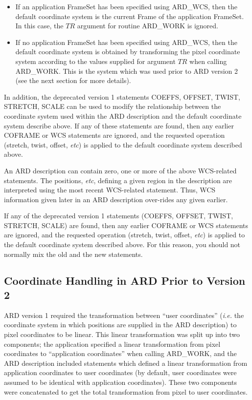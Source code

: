 \documentclass[11pt,nolof]{starlink}
\begin{document}
\begin{enumerate}
\begin{itemize}
\item If an application FrameSet has been specified using ARD\_WCS, then
the default coordinate system is the current Frame of the application
FrameSet. In this case, the $TR$ argument for routine ARD\_WORK is ignored.

\item If no application FrameSet has been specified using ARD\_WCS, then
the default coordinate system is obtained by transforming the pixel
coordinate system according to the values supplied for argument $TR$ when
calling ARD\_WORK. This is the system which was used prior to ARD version
2 (see the next section for more details).
\end{itemize}

In addition, the deprecated version 1 statements COEFFS, OFFSET, TWIST,
STRETCH, SCALE can be used to modify the relationship between the
coordinate system used within the ARD description and the default
coordinate system describe above. If any of these statements are found,
then any earlier COFRAME or WCS statements are ignored, and the requested
operation (stretch, twist, offset, \emph{etc}) is applied to the default
coordinate system described above.

\end{enumerate}

An ARD description can contain zero, one or more of the above WCS-related
statements. The positions, \emph{etc}, defining a given region in the
description are interpreted using the most recent WCS-related statement.
Thus, WCS information given later in an ARD description over-rides any
given earlier.

If any of the deprecated version 1 statements (COEFFS, OFFSET, TWIST,
STRETCH, SCALE) are found, then any earlier COFRAME or WCS statements are
ignored, and the requested operation (stretch, twist, offset, \emph{etc}) is
applied to the default coordinate system described above. For this
reason, you should not normally mix the old and the new statements.

\subsection{Coordinate Handling in ARD Prior to Version 2}

ARD version 1 required the transformation between ``user coordinates''
(\emph{i.e.} the coordinate system in which positions are supplied in the
ARD description) to pixel coordinates to be linear. This linear
transformation was split up into two components; the application specified
a linear transformation from pixel coordinates to ``application
coordinates'' when calling ARD\_WORK, and the ARD description included
statements which defined a linear transformation from application
coordinates to user coordinates (by default, user coordinates were
assumed to be identical with application coordinates). These two
components were concatenated to get the total transformation from pixel
to user coordinates.
\end{document}
